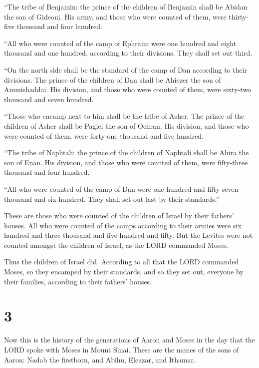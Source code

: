  ``The tribe of Benjamin: the prince of the children of
Benjamin shall be Abidan the son of Gideoni.  His army, and
those who were counted of them, were thirty-five thousand and four
hundred.

 ``All who were counted of the camp of Ephraim were one
hundred and eight thousand and one hundred, according to their
divisions. They shall set out third.

 ``On the north side shall be the standard of the camp of
Dan according to their divisions. The prince of the children of Dan
shall be Ahiezer the son of Ammishaddai.  His division, and
those who were counted of them, were sixty-two thousand and seven
hundred.

 ``Those who encamp next to him shall be the tribe of
Asher. The prince of the children of Asher shall be Pagiel the son of
Ochran.  His division, and those who were counted of them,
were forty-one thousand and five hundred.

 ``The tribe of Naphtali: the prince of the children of
Naphtali shall be Ahira the son of Enan.  His division, and
those who were counted of them, were fifty-three thousand and four
hundred.

 ``All who were counted of the camp of Dan were one hundred
and fifty-seven thousand and six hundred. They shall set out last by
their standards.''

 These are those who were counted of the children of Israel
by their fathers' houses. All who were counted of the camps according to
their armies were six hundred and three thousand and five hundred and
fifty.  But the Levites were not counted amongst the
children of Israel, as the LORD commanded Moses.

 Thus the children of Israel did. According to all that the
LORD commanded Moses, so they encamped by their standards, and so they
set out, everyone by their families, according to their fathers' houses.

\hypertarget{section-2}{%
\section{3}\label{section-2}}

 Now this is the history of the generations of Aaron and
Moses in the day that the LORD spoke with Moses in Mount Sinai.
 These are the names of the sons of Aaron: Nadab the
firstborn, and Abihu, Eleazar, and Ithamar.

